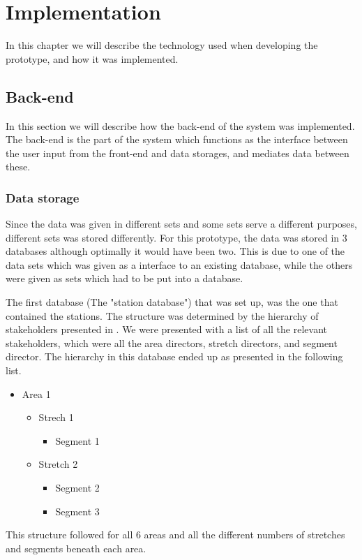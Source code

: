 
\chapter{Implementation} %
\label{cha:implementation}
In this chapter we will describe the technology used when developing the 
prototype, and how it was implemented. 

\section{Back-end} %
\label{sec:back_end}
In this section we will describe how the back-end of the system was 
implemented. The back-end is the part of the system which functions as the
interface between the user input from the front-end and data storages, and
mediates data between these.

\subsection{Data storage} %
\label{sub:back_end_data_storage}
Since the data was given in different sets and some sets serve a different
purposes, different sets was stored differently. For this prototype, the data
was stored in 3 databases although optimally it would have been two. This is 
due to one of the data sets which was given as a interface to an existing 
database, while the others were given as sets which had to be put into a 
database.

The first database (The "station database") that was set up, was the one that 
contained the stations.
The structure was determined by the hierarchy of stakeholders presented in
.  We were presented with a list of all the
relevant stakeholders, which were all the area directors, stretch directors,
and segment director. The hierarchy in this database ended up as presented in
the following list.

\begin{itemize}
	\item Area 1
	\begin{itemize}
		\item Strech 1
		\begin{itemize}
			\item Segment 1
		\end{itemize}
		\item Stretch 2
		\begin{itemize}
			\item Segment 2
			\item Segment 3
		\end{itemize}
	\end{itemize}
\end{itemize}
This structure followed for all 6 areas and all the different numbers of
stretches and segments beneath each area. \\

